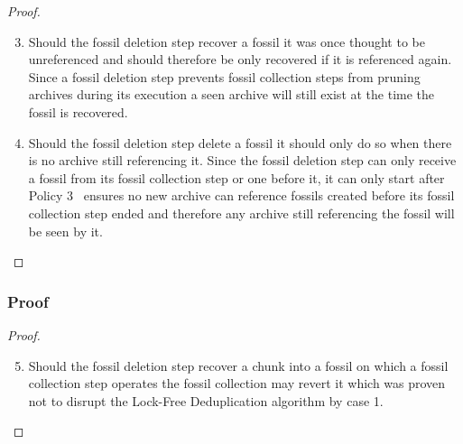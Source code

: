 \documentclass[english,utf8,aspectratio=169]{beamer}
\begin{document}
    \begin{frame}
        \begin{proof}
            \begin{enumerate}
                \setcounter{enumi}{2}
                \item Should the fossil deletion step recover a fossil it was once thought to be unreferenced
                    and should therefore be only recovered if it is referenced again.
                    Since a fossil deletion step prevents fossil collection steps from pruning archives
                    during its execution a seen archive will still exist at the time the fossil is recovered.
                \item Should the fossil deletion step delete a fossil it should only do so when there is no
                    archive still referencing it.
                    Since the fossil deletion step can only receive a fossil from its fossil collection
                    step or one before it, it can only start after Policy 3~\cite{Duplicacy} ensures no
                    new archive can reference fossils created before its fossil collection step ended and
                    therefore any archive still referencing the fossil will be seen by it.
            \end{enumerate}
        \end{proof}
    \end{frame}

    \begin{frame}
        \frametitle{Proof}
        \begin{proof}
            \begin{enumerate}
                \setcounter{enumi}{4}
                \item Should the fossil deletion step recover a chunk into a fossil on which a fossil
                    collection step operates the fossil collection may revert it which was proven not to
                    disrupt the Lock-Free Deduplication algorithm by case 1.
            \end{enumerate}
        \end{proof}
    \end{frame}
\end{document}
